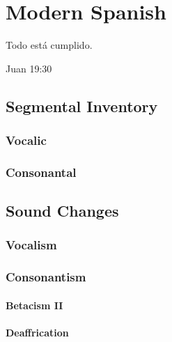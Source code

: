 \documentclass{report}[12pt]
\begin{document}
\thispagestyle{empty}

\pagebreak

\chapter{Modern Spanish}

\epigraph{Todo está cumplido.}{Juan 19:30}

\section{Segmental Inventory}

\subsection{Vocalic}

\subsection{Consonantal}

\section{Sound Changes}

\subsection{Vocalism}

\subsection{Consonantism}

\subsubsection{Betacism II}\label{sec:betacism_2}

\begin{tcolorbox}

\end{tcolorbox}

\subsubsection{Deaffrication}

\begin{tcolorbox}

\end{tcolorbox}
\end{document}
